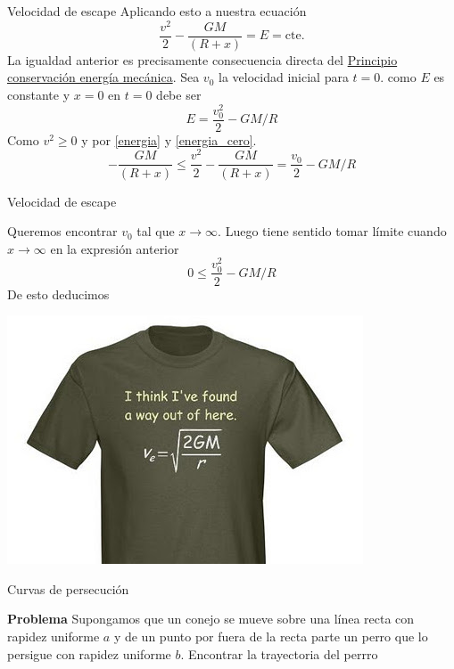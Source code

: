\documentclass[handout,hyperref={colorlinks=true}]{beamer}
\begin{document}
\begin{frame}{Velocidad de escape}
Aplicando esto a nuestra ecuación
\begin{equation}\label{energia}
 \frac{v^2}{2}-\frac{GM}{(R+x)}=E=\text{cte}.
\end{equation}
  La igualdad anterior es precisamente 
 consecuencia directa del \href{https://docs.google.com/file/d/0B80iJ0HgObRRWll6MlJFSjFNMGc/edit}{Principio conservación energía mecánica}.
Sea $v_0$ la velocidad inicial para $t=0$. como $E$ es constante y $x=0$ en $t=0$ debe ser 
\begin{equation}\label{energia_cero}
 E=\frac{v_0^2}{2}-GM/R
\end{equation}
Como $v^2\geq 0$ y por \eqref{energia} y \eqref{energia_cero}.
\[-\frac{GM}{(R+x)}\leq\frac{v^2}{2}-\frac{GM}{(R+x)}=\frac{v_0}{2}-GM/R\]
 

\end{frame}

\begin{frame}{Velocidad de escape}
 
\onslide<+-> Queremos encontrar $v_0$ tal que $x\to\infty$. Luego tiene sentido tomar límite cuando $x\to\infty$ en la expresión anterior 
\[0\leq \frac{v_0^2}{2}-GM/R\]
\onslide<+-> De esto deducimos 

\begin{center}
 \includegraphics[scale=.4]{imagenes/velocidad_escape.jpg}
\end{center}

\end{frame}


\begin{frame}{Curvas de persecución}
 
\textbf{Problema} Supongamos que un conejo se mueve sobre una 
línea recta con rapidez uniforme $a$ y de un punto por fuera de la recta parte un perro que lo 
persigue con rapidez uniforme $b$. Encontrar la trayectoria del perrro
 
\begin{center}
\end{center}

 
 
 
\end{frame}
\end{document}
